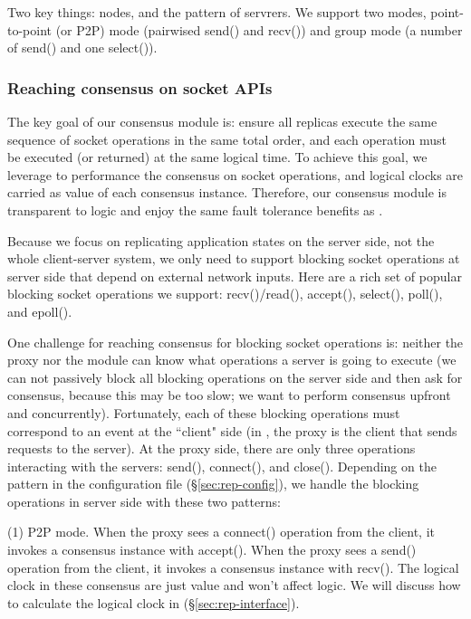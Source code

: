 Two key things: nodes, and the pattern of servrers. We support two modes, 
point-to-point (or P2P) mode (pairwised send() and recv()) and group mode (a number of send() 
and one select()).

\subsubsection{Reaching consensus on socket APIs} \label{sec:rep-consensus}
The key goal of our consensus module is: ensure all replicas execute the same 
sequence of socket operations in the same total order, and each operation must 
be executed (or returned) at the same logical time. To achieve this goal, we 
leverage \paxos to performance the consensus on socket operations, and 
logical clocks are carried as value of each consensus instance. Therefore, our 
consensus module is transparent to \paxos logic and enjoy the same fault tolerance 
benefits as \paxos.

Because we focus on replicating application states on the server side, not the 
whole client-server system, we only need to support blocking socket operations at server side
that depend on external network inputs. Here are a rich set of popular 
blocking socket operations we support: recv()/read(), accept(), select(), poll(), and 
epoll().

One challenge for reaching consensus for blocking socket operations is: neither the proxy nor 
the \smt module can know what operations a server is going to execute (we can 
not passively block all blocking operations on the server side and then ask for 
consensus, because this may be too slow; we want to perform consensus upfront 
and concurrently). Fortunately, each of these blocking operations must 
correspond to an event at the ``client" side (in \msmr, the proxy is the client 
that sends requests to the server). At the proxy side, there are only three 
operations interacting with the servers: send(), connect(), and close(). 
Depending on the pattern in the configuration file (\S\ref{sec:rep-config}), we 
handle the blocking operations in server side with these two patterns:

(1) P2P mode. When the proxy sees a connect() operation from the client, it invokes a 
consensus instance with accept(). When the proxy sees a send() operation from the client, it 
invokes a consensus instance with recv(). The logical clock in these consensus 
are just value and won't affect \paxos logic. We will discuss how to calculate 
the logical clock in (\S\ref{sec:rep-interface}).

